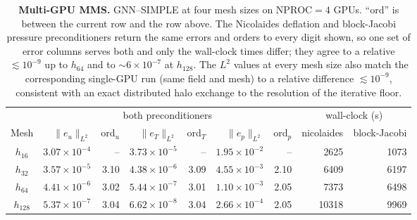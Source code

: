 \begin{table}[ht]
\centering
\caption{\textbf{Multi-GPU MMS.} GNN--SIMPLE at four mesh sizes on $\text{NPROC}=4$ GPUs.
``ord'' is between the current row and the row above. The Nicolaides deflation and
block-Jacobi pressure preconditioners return the same errors and orders to every digit shown,
so one set of error columns serves both and only the wall-clock times differ; they agree to a
relative $\lesssim\!10^{-9}$ up to $h_{64}$ and to $\sim\!6\times10^{-7}$ at $h_{128}$. The
$L^{2}$ values at every mesh size also match the corresponding single-GPU run (same field and
mesh) to a relative difference $\lesssim 10^{-9}$, consistent with an exact distributed halo
exchange to the resolution of the iterative floor.}
\label{tab:mms-distributed}
\footnotesize\setlength{\tabcolsep}{4pt}
\begin{tabular}{c r r r r r r r r}
\toprule
 & \multicolumn{6}{c}{both preconditioners} & \multicolumn{2}{c}{wall-clock (s)} \\
\cmidrule(lr){2-7}\cmidrule(lr){8-9}
Mesh & $\|e_{u}\|_{L^{2}}$ & ord$_{u}$ &
$\|e_{T}\|_{L^{2}}$ & ord$_{T}$ &
$\|e_{p}\|_{L^{2}}$ & ord$_{p}$ & nicolaides & block-Jacobi \\
\midrule
$h_{16}$  & $3.07\!\times\!10^{-4}$ & --   & $3.73\!\times\!10^{-5}$ & --   & $1.95\!\times\!10^{-2}$ & --   & 2625 & 1073 \\
$h_{32}$  & $3.57\!\times\!10^{-5}$ & 3.10 & $4.38\!\times\!10^{-6}$ & 3.09 & $4.55\!\times\!10^{-3}$ & 2.10 & 6409 & 6197 \\
$h_{64}$  & $4.41\!\times\!10^{-6}$ & 3.02 & $5.44\!\times\!10^{-7}$ & 3.01 & $1.10\!\times\!10^{-3}$ & 2.05 & 7373 & 6498 \\
$h_{128}$ & $5.37\!\times\!10^{-7}$ & 3.04 & $6.62\!\times\!10^{-8}$ & 3.04 & $2.66\!\times\!10^{-4}$ & 2.05 & 10318 & 9969 \\
\bottomrule
\end{tabular}
\end{table}
